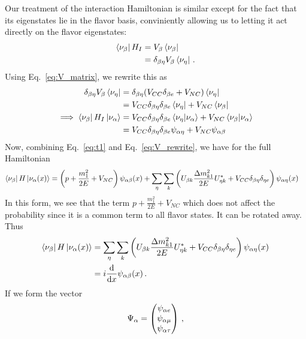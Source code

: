 Our treatment of the interaction Hamiltonian is similar except for the fact that its eigenstates lie in the flavor basis, conviniently allowing us
to letting it act directly on the flavor eigenstates:
\begin{align}
    \bra{\nu_\beta}H_I &= V_\beta \bra{\nu_\beta} \nonumber \\
                    &= \delta_{\beta\eta} V_\beta \bra{\nu_\eta}\,.
\end{align}
Using Eq.~\ref{eq:V_matrix}, we rewrite this as
\begin{align}\label{eq:V_rewrite}
    \delta_{\beta\eta} V_\beta \bra{\nu_\eta} &= \delta_{\beta\eta} (V_{CC}\delta_{\beta e} + V_{NC}) \bra{\nu_\eta} \nonumber \\
                                           &= V_{CC}\delta_{\beta\eta}\delta_{\beta e} \bra{\nu_\eta} + V_{NC}\bra{\nu_\beta} \nonumber \\
    \implies \bra{\nu_\beta}H_I\ket{\nu_\alpha}   &= V_{CC}\delta_{\beta\eta}\delta_{\beta e} \bra{\nu_\eta}\ket{\nu_\alpha} + V_{NC}\bra{\nu_\beta}\ket{\nu_\alpha} \nonumber \\
                                           &= V_{CC}\delta_{\beta\eta}\delta_{\beta e} \psi_{\alpha\eta} + V_{NC}\psi_{\alpha\beta}
\end{align}
Now, combining Eq.~\ref{eq:t1} and Eq.~\ref{eq:V_rewrite}, we have for the full Hamiltonian
\begin{align}
    \bra{\nu_\b}H\ket{\nu_\a (x)} &= \left(p + \frac{m^2_1}{2E} + V_{NC}\right) \psi_{\a\b}(x) + \sum_\eta\sum_k \left(U_{\b k} \frac{\dm_{k1}}{2E} U^*_{\eta k} + V_{CC}\delta_{\b\eta}\delta_{\eta e} \right) \psi_{\a\eta}(x)
\end{align}
In this form, we see that the term $p + \frac{m^2_1}{2E} + V_{NC}$  which does not affect the probability since it is a common term to all flavor states. It can be rotated away.
Thus
\begin{align}\label{eq:components}
    \bra{\nu_\b}H\ket{\nu_\a (x)} &= \sum_\eta\sum_k \left(U_{\b k} \frac{\dm_{k1}}{2E} U^*_{\eta k} + V_{CC}\delta_{\b\eta}\delta_{\eta e}\right) \psi_{\a\eta}(x) \nonumber \\
                                  &= i \dv{}{x}\psi_{\a\b}(x)\,.
\end{align}
If we form the vector 
\begin{align}
    \Psi_\alpha = \begin{pmatrix}
        \psi_{\alpha e} \\
        \psi_{\alpha \mu} \\
        \psi_{\alpha \tau}
    \end{pmatrix}\,,
\end{align}
